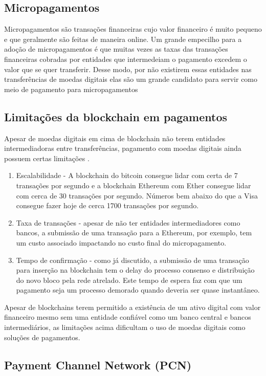 \documentclass[12pt]{article}
\begin{document}
\subsection{Micropagamentos}

Micropagamentos são transações financeiras cujo valor financeiro é muito pequeno e que geralmente são feitas de maneira online. Um grande empecilho para a adoção de micropagamentos é que muitas vezes as taxas das transações financeiras cobradas por entidades que intermedeiam o pagamento excedem o valor que se quer transferir. Desse modo, por não existirem essas entidades nas transferências de moedas digitais elas são um grande candidato para servir como meio de pagamento para micropagamentos

\subsection{Limitações da blockchain em pagamentos}

Apesar de moedas digitais em cima de blockchain não terem entidades intermediadoras entre transferências, pagamento com moedas digitais ainda possuem certas limitações \cite{mercan2021cryptocurrency}.
\begin{enumerate}
    \item Escalabilidade - A blockchain do bitcoin consegue lidar com certa de 7 transações por segundo e a blockchain Ethereum com Ether consegue lidar com cerca de 30 transações por segundo. Números bem abaixo do que a Visa consegue fazer hoje de cerca 1700 transações por segundo.
    \item Taxa de transações - apesar de não ter entidades intermediadores como bancos, a submissão de uma transação para a Ethereum, por exemplo, tem um custo associado impactando no custo final do micropagamento. 
    \item Tempo de confirmação - como já discutido, a submissão de uma transação para inserção na blockchain tem o delay do processo consenso e distribuição do novo bloco pela rede atrelado. Este tempo de espera faz com que um pagamento seja um processo demorado quando deveria ser quase instantâneo. 
\end{enumerate}

Apesar de blockchains terem permitido a existência de um ativo digital com valor financeiro mesmo sem uma entidade confiável como um banco central e bancos intermediários, as limitações acima dificultam o uso de moedas digitais como soluções de pagamentos. 

\subsection{Payment Channel Network (PCN)}
\end{document}

